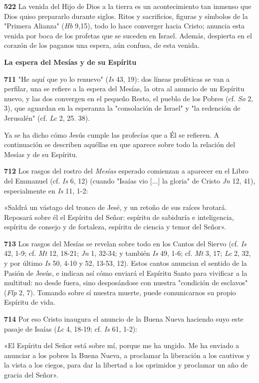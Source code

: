 \documentclass[]{article}
\begin{document}
\textbf{522} La venida del Hijo de Dios a la tierra es un acontecimiento
tan inmenso que Dios quiso prepararlo durante siglos. Ritos y
sacrificios, figuras y símbolos de la "Primera Alianza" (\emph{Hb}
9,15), todo lo hace converger hacia Cristo; anuncia esta venida por boca
de los profetas que se suceden en Israel. Además, despierta en el
corazón de los paganos una espera, aún confusa, de esta venida.

\textbf{La espera del Mesías y de su Espíritu}

\textbf{711} "He aquí que yo lo renuevo" (\emph{Is} 43, 19): dos líneas
proféticas se van a perfilar, una se refiere a la espera del Mesías, la
otra al anuncio de un Espíritu nuevo, y las dos convergen en el pequeño
Resto, el pueblo de los Pobres (cf. \emph{So} 2, 3), que aguardan en la
esperanza la "consolación de Israel" y "la redención de Jerusalén" (cf.
\emph{Lc} 2, 25. 38).

Ya se ha dicho cómo Jesús cumple las profecías que a Él se refieren. A
continuación se describen aquéllas en que aparece sobre todo la relación
del Mesías y de su Espíritu.

\textbf{712} Los rasgos del rostro del \emph{Mesías} esperado comienzan
a aparecer en el Libro del Emmanuel (cf. \emph{Is} 6, 12) (cuando
"Isaías vio {[}...{]} la gloria" de Cristo \emph{Jn} 12, 41),
especialmente en \emph{Is} 11, 1-2:

«Saldrá un vástago del tronco de Jesé, y un retoño de sus raíces
brotará. Reposará sobre él el Espíritu del Señor: espíritu de sabiduría
e inteligencia, espíritu de consejo y de fortaleza, espíritu de ciencia
y temor del Señor».

\textbf{713} Los rasgos del Mesías se revelan sobre todo en los Cantos
del Siervo (cf. \emph{Is} 42, 1-9; cf. \emph{Mt} 12, 18-21; \emph{Jn} 1,
32-34; y también \emph{Is} 49, 1-6; cf. \emph{Mt} 3, 17; \emph{Lc} 2,
32, y por último \emph{Is} 50, 4-10 y 52, 13-53, 12). Estos cantos
anuncian el sentido de la Pasión de Jesús, e indican así cómo enviará el
Espíritu Santo para vivificar a la multitud: no desde fuera, sino
desposándose con nuestra "condición de esclavos" (\emph{Flp} 2, 7).
Tomando sobre sí nuestra muerte, puede comunicarnos su propio Espíritu
de vida.

\textbf{714} Por eso Cristo inaugura el anuncio de la Buena Nueva
haciendo suyo este pasaje de Isaías (\emph{Lc} 4, 18-19; cf. \emph{Is}
61, 1-2):

«El Espíritu del Señor está sobre mí, porque me ha ungido. Me ha enviado
a anunciar a los pobres la Buena Nueva, a proclamar la liberación a los
cautivos y la vista a los ciegos, para dar la libertad a los oprimidos y
proclamar un año de gracia del Señor».
\end{document}
